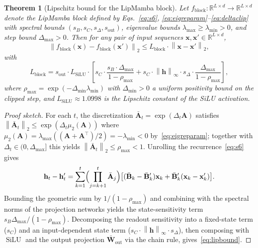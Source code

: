 \documentclass[journal,a4paper,10pt]{IEEEtran}
\newtheorem{theorem}{Theorem}
\theoremstyle{definition}
\theoremstyle{remark}
\newcommand{\modelname}{LipMamba}
\newcommand{\R}{\mathbb{R}}
\newcommand{\norm}[1]{\left\|#1\right\|}
\DeclareMathOperator{\SiLU}{SiLU}
\begin{document}
\begin{theorem}[Lipschitz bound for the \modelname{} block]
\label{thm:lip}
Let $f_{\mathrm{block}}: \R^{L \times d} \to \R^{L \times d}$ denote the \modelname{} block defined by Eqs.~\eqref{eq:s6}, \eqref{eq:eigreparam}--\eqref{eq:deltaclip} with spectral bounds $(s_B, s_C, s_\Delta, s_{\mathrm{out}})$, eigenvalue bounds $\lambda_{\max} \geq \lambda_{\min} > 0$, and step bound $\Delta_{\max} > 0$. Then for any pair of input sequences $\mathbf{x}, \mathbf{x}' \in \R^{L \times d}$,
\begin{equation}
    \norm{f_{\mathrm{block}}(\mathbf{x}) - f_{\mathrm{block}}(\mathbf{x}')}_2 \leq L_{\mathrm{block}} \cdot \norm{\mathbf{x} - \mathbf{x}'}_2,
\end{equation}
with
\begin{equation}
    L_{\mathrm{block}} = s_{\mathrm{out}} \cdot L_{\SiLU} \cdot \left[ s_C \cdot \frac{s_B \cdot \Delta_{\max}}{1 - \rho_{\max}} + s_C \cdot \norm{\mathbf{h}}_{\infty} \cdot s_\Delta \cdot \frac{\Delta_{\max}}{1 - \rho_{\max}} \right],
    \label{eq:lipbound}
\end{equation}
where $\rho_{\max} = \exp(-\Delta_{\min} \lambda_{\min})$ with $\Delta_{\min} > 0$ a uniform positivity bound on the clipped step, and $L_{\SiLU} \approx 1.0998$ is the Lipschitz constant of the SiLU activation.
\end{theorem}

\begin{proof}[Proof sketch]
For each $t$, the discretization $\bar{\mathbf{A}}_t = \exp(\Delta_t \mathbf{A})$ satisfies $\norm{\bar{\mathbf{A}}_t}_2 \leq \exp(\Delta_t \mu_2(\mathbf{A}))$ where $\mu_2(\mathbf{A}) = \lambda_{\max}((\mathbf{A} + \mathbf{A}^\top)/2) = -\lambda_{\min} < 0$ by~\eqref{eq:eigreparam}; together with $\Delta_t \in (0, \Delta_{\max}]$ this yields $\norm{\bar{\mathbf{A}}_t}_2 \leq \rho_{\max} < 1$. Unrolling the recurrence~\eqref{eq:s6} gives
\begin{equation}
    \mathbf{h}_t - \mathbf{h}_t' = \sum_{k=1}^t \Bigl(\prod_{j=k+1}^t \bar{\mathbf{A}}_j\Bigr) \bigl[(\bar{\mathbf{B}}_k - \bar{\mathbf{B}}_k') \mathbf{x}_k + \bar{\mathbf{B}}_k'(\mathbf{x}_k - \mathbf{x}_k')\bigr].
\end{equation}
Bounding the geometric sum by $1/(1 - \rho_{\max})$ and combining with the spectral norms of the projection networks yields the state-sensitivity term $s_B \Delta_{\max} / (1 - \rho_{\max})$. Decomposing the readout sensitivity into a fixed-state term ($s_C$) and an input-dependent state term ($s_C \cdot \norm{\mathbf{h}}_\infty \cdot s_\Delta$), then composing with $\SiLU$ and the output projection $\bar{\mathbf{W}}_{\mathrm{out}}$ via the chain rule, gives~\eqref{eq:lipbound}.
\end{proof}
\end{document}
